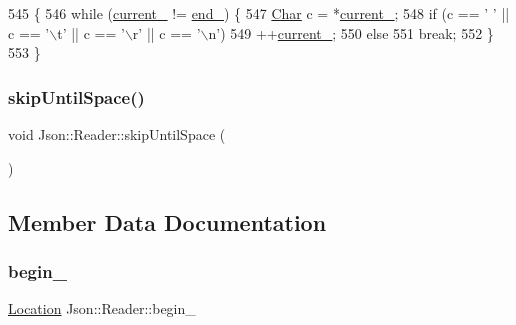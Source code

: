 \begin{DoxyCode}
545                         \{
546   \textcolor{keywordflow}{while} (\hyperlink{class_json_1_1_reader_a2f2feb5201a26da7aa133d2f7434479b}{current\_} != \hyperlink{class_json_1_1_reader_a714793579cbf4ee7c5a7223d2c8d77c1}{end\_}) \{
547     \hyperlink{class_json_1_1_reader_a3eec9118f3e9a672ba8348c3a79d0f45}{Char} c = *\hyperlink{class_json_1_1_reader_a2f2feb5201a26da7aa133d2f7434479b}{current\_};
548     \textcolor{keywordflow}{if} (c == \textcolor{charliteral}{' '} || c == \textcolor{charliteral}{'\(\backslash\)t'} || c == \textcolor{charliteral}{'\(\backslash\)r'} || c == \textcolor{charliteral}{'\(\backslash\)n'})
549       ++\hyperlink{class_json_1_1_reader_a2f2feb5201a26da7aa133d2f7434479b}{current\_};
550     \textcolor{keywordflow}{else}
551       \textcolor{keywordflow}{break};
552   \}
553 \}
\end{DoxyCode}
\mbox{\label{class_json_1_1_reader_ad922ea5a8ab333084edbb84827861fa3}} 
\subsubsection{\texorpdfstring{skip\+Until\+Space()}{skipUntilSpace()}}
{\footnotesize\ttfamily void Json\+::\+Reader\+::skip\+Until\+Space (\begin{DoxyParamCaption}{ }\end{DoxyParamCaption})\hspace{0.3cm}{\ttfamily [private]}}



\subsection{Member Data Documentation}
\mbox{\label{class_json_1_1_reader_a327166839022ea91f0a8290960a8af76}} 
\subsubsection{\texorpdfstring{begin\+\_\+}{begin\_}}
{\footnotesize\ttfamily \hyperlink{class_json_1_1_reader_a46795b5b272bf79a7730e406cb96375a}{Location} Json\+::\+Reader\+::begin\+\_\+\hspace{0.3cm}{\ttfamily [private]}}



